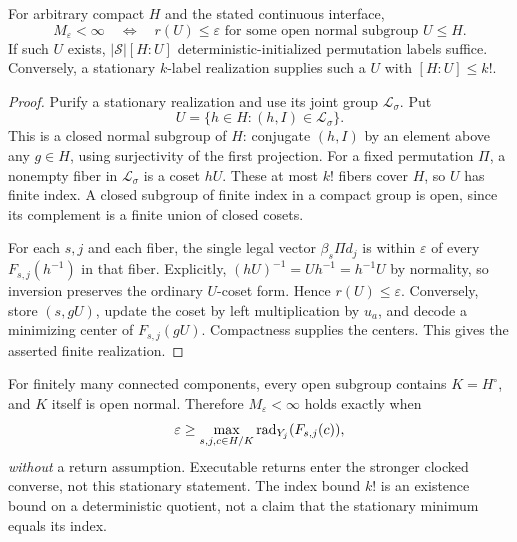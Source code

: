\begin{theorem}\label{thm:finitequotient55}
For arbitrary compact $H$ and the stated continuous interface,
\[
 M_\varepsilon<\infty
 \quad\Longleftrightarrow\quad
 r(U)\le\varepsilon\text{ for some open normal subgroup }U\le H.
\]
If such $U$ exists, $|\mathcal S|[H:U]$ deterministic-initialized permutation labels suffice. Conversely, a stationary $k$-label realization supplies such a $U$ with $[H:U]\le k!$.
\end{theorem}
\begin{proof}
Purify a stationary realization and use its joint group $\mathcal L_\sigma$. Put
\[
                  U=\{h\in H:(h,I)\in\mathcal L_\sigma\}.
\]
This is a closed normal subgroup of $H$: conjugate $(h,I)$ by an element above any $g\in H$, using surjectivity of the first projection. For a fixed permutation $\Pi$, a nonempty fiber in $\mathcal L_\sigma$ is a coset $hU$. These at most $k!$ fibers cover $H$, so $U$ has finite index. A closed subgroup of finite index in a compact group is open, since its complement is a finite union of closed cosets.

For each $s,j$ and each fiber, the single legal vector $\beta_s\Pi d_j$ is within $\varepsilon$ of every $F_{s,j}(h^{-1})$ in that fiber. Explicitly, $(hU)^{-1}=Uh^{-1}=h^{-1}U$ by normality, so inversion preserves the ordinary $U$-coset form. Hence $r(U)\le\varepsilon$. Conversely, store $(s,gU)$, update the coset by left multiplication by $u_a$, and decode a minimizing center of $F_{s,j}(gU)$. Compactness supplies the centers. This gives the asserted finite realization.
\end{proof}
For finitely many connected components, every open subgroup contains $K=H^\circ$, and $K$ itself is open normal. Therefore $M_\varepsilon<\infty$ holds exactly when
\[
 \varepsilon\ge\max_{s,j,c\in H/K}\operatorname{rad}_{Y_j}(F_{s,j}(c)),
\]
\emph{without} a return assumption. Executable returns enter the stronger clocked converse, not this stationary statement. The index bound $k!$ is an existence bound on a deterministic quotient, not a claim that the stationary minimum equals its index.

